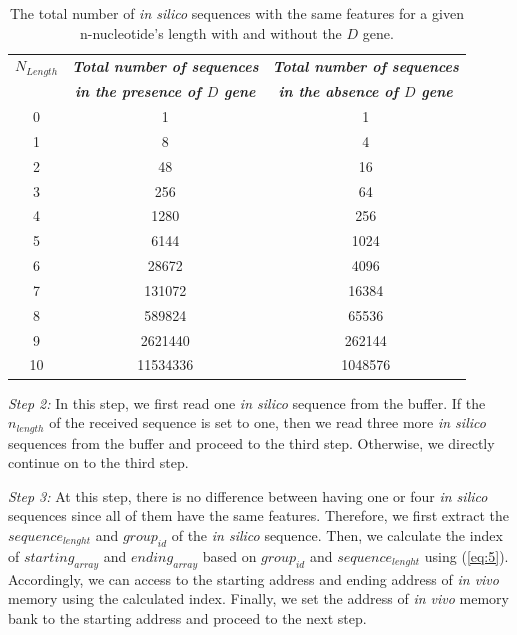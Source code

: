 \begin{table}[t!]
\caption{The total number of \emph{in silico} sequences with the same features for a given n-nucleotide's length with and without the $D$ gene.}
\begin{center}
\begin{tabular}{ |c|c|c| }
  \hline
    $N_{Length}$ & \textbf{\textit{Total number of sequences }}& \textbf{\textit{ Total number of sequences}} \\	
    ~ & \textbf{\textit{in the presence of  $D$ gene}} & \textbf{\textit{in the absence of $D$ gene}} \\		\hline
    0 & 1 & 1 \\	\hline
    1 & 8 & 4\\	\hline
   	2 & 48 & 16 \\	\hline
    3 & 256 & 64\\	\hline
    4 & 1280 & 256 \\	\hline
    5 & 6144 & 1024 \\	\hline
    6 & 28672 & 4096\\	\hline
   	7 & 131072 & 16384 \\	\hline
    8 & 589824 & 65536\\	\hline
    9 & 2621440 & 262144 \\	\hline
    10 & 11534336 & 1048576\\
  \hline
\end{tabular}

  \label{tab:2}
\end{center}
\end{table}  

\emph{Step 2:} In this step, we first read one \emph{in silico} sequence from the buffer. If the $n_{length}$ of the received sequence is set to one, then we read three more \emph{in silico} sequences from the buffer and proceed to the third step. Otherwise, we directly continue on to the third step. 

\emph{Step 3:} At this step, there is no difference between having one or four \emph{in silico} sequences since all of them have the same features. Therefore, we first extract the $sequence_{lenght}$ and $group_{id}$ of the \emph{in silico} sequence. Then, we calculate the index of $starting_{array}$ and $ending_{array}$ based on $group_{id}$ and $sequence_{lenght}$ using (\ref{eq:5}). Accordingly, we can access to the starting address and ending address of \emph{in vivo} memory using the calculated index. Finally, we set the address of \emph{in vivo} memory bank to the starting address and proceed to the next step.

